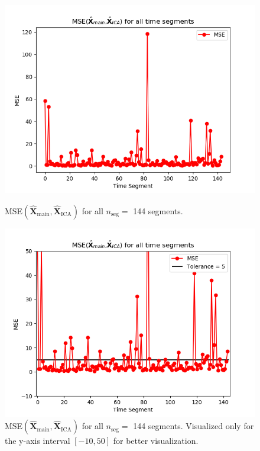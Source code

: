 \begin{figure}[H]
\begin{widepage}
    \begin{minipage}[t]{.45\textwidth}
		\centering
		\includegraphics[width=1\linewidth]{figures/ch_7/resultat/average_mse_third_removed_ica}
	\caption{MSE$\left(\hat{\mathbf{X}}_{\text{main}},\hat{\mathbf{X}}_{\text{ICA}}\right)$ for all $n_{\text{seg}} = $ 144 segments.}
	\label{fig:M<N_1}
    \end{minipage} 
\hspace{0.5cm}
    \begin{minipage}[t]{.45\textwidth}
        \centering
		\includegraphics[width=1\linewidth]{figures/ch_7/resultat/average_mse_third_removed_ica_zoom.png}
	\caption{MSE$\left(\hat{\mathbf{X}}_{\text{main}},\hat{\mathbf{X}}_{\text{ICA}}\right)$ for all $n_{\text{seg}} = $ 144 segments. Visualized only for the y-axis interval $[-10, 50]$ for better visualization.}
	\label{fig:M<N_1_2}
    \end{minipage}
\end{widepage}
\end{figure}
